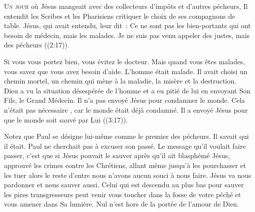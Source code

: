 



\lettrine{U}{n jour} où Jésus mangeait avec des collecteurs d'impôts
 et d'autres pécheurs, Il entendit les Scribes et les Pharisiens
 critiquer le choix de ses compagnons de table.
 \og Jésus, qui avait entendu, leur dit~:
 Ce ne sont pas les bien-portants qui ont besoin de médecin,
 mais les malades. Je ne suis pas venu appeler des justes,
 mais des pécheurs \fg{} 
 ((2:17)).


Si vous vous portez bien, vous évitez le docteur.
 Mais quand vous êtes malades, vous savez que vous avez besoin d'aide.
 L'homme était malade. Il avait choisi un chemin mortel,
 un chemin qui mène à la maladie, la misère et la destruction.
 Dieu a vu la situation désespérée de l'homme et a eu pitié de lui
 en envoyant Son Fils, le Grand Médecin.
 Il n'a pas envoyé Jésus pour condamner le monde.
 Cela n'était pas nécessaire ,
 car le monde était déjà condamné. Il a envoyé Jésus
 \og pour que le monde soit sauvé par Lui \fg{} 
 ((3:17)).

Notez que Paul se désigne lui-même comme le premier des pécheurs.
 Il savait qui il était. Paul ne cherchait pas à excuser son passé.
 Le message qu'il voulait faire passer, c'est que si Jésus pouvait le sauver
 \ocadr après qu'il ait blasphémé Jésus, approuvé les crimes
 contre les Chrétiens, allant même jusqu'à les pourchasser
 et les tuer \fcadr{} alors le reste d'entre nous n'avons aucun souci
 à nous faire. Jésus va nous pardonner et nous sauver aussi.
 Celui qui est descendu au plus bas pour sauver les pires transgresseurs
 peut venir vous toucher dans la fosse de votre péché
 et vous amener dans Sa lumière.
 Nul n'est hors de la portée de l'amour de Dieu.

\dvrule



